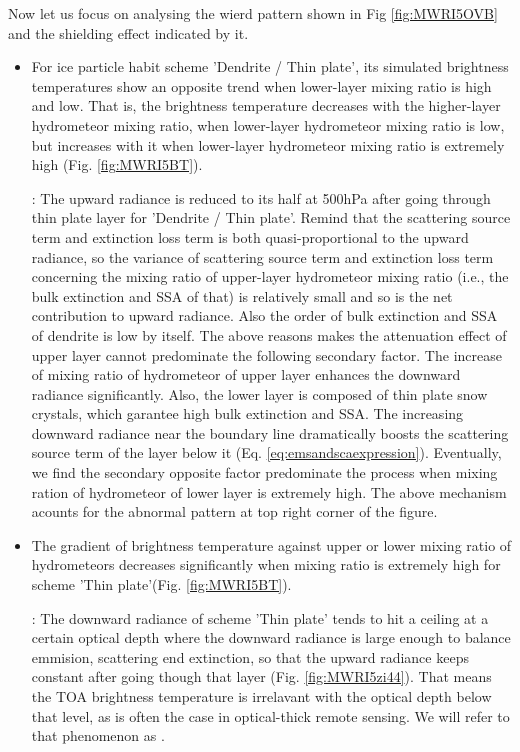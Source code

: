 Now let us focus on analysing the wierd pattern shown in Fig \ref{fig:MWRI5OVB} and the shielding effect indicated by it.
\begin{itemize}
    \item {}
    For ice particle habit scheme 'Dendrite / Thin plate', its simulated brightness temperatures show an opposite trend when 
lower-layer mixing ratio is high and low. That is, the brightness temperature decreases with the higher-layer hydrometeor mixing ratio,    
when lower-layer hydrometeor mixing ratio is low, but increases with it when lower-layer hydrometeor mixing ratio is extremely high
(Fig. \ref{fig:MWRI5BT}).

    :
    The upward radiance is reduced to its half at 500hPa after going through thin plate layer for 'Dendrite / Thin plate'. Remind that
the scattering source term and extinction loss term is both quasi-proportional to the upward radiance, so the variance of scattering source
term and extinction loss term concerning the mixing ratio of upper-layer hydrometeor mixing ratio (i.e., the bulk extinction and SSA of that)
is relatively small and so is the net contribution to upward radiance. Also the order of bulk extinction and SSA of dendrite is low by itself.
The above reasons makes the attenuation effect of upper layer cannot predominate the following secondary factor. 
    The increase of mixing ratio of hydrometeor of upper layer enhances the downward radiance significantly. Also, the lower layer is composed of
thin plate snow crystals, which garantee high bulk extinction and SSA. The increasing downward radiance near the boundary line dramatically boosts the
scattering source term of the layer below it (Eq. \ref{eq:emsandscaexpression}). Eventually, we find the secondary opposite factor predominate
the process when mixing ration of hydrometeor of lower layer is extremely high.   
    The above mechanism acounts for the abnormal pattern at top right corner of the figure.
    
    \item {}
    The gradient of brightness temperature against upper or lower mixing ratio of hydrometeors decreases significantly when mixing ratio is extremely high
for scheme 'Thin plate'(Fig. \ref{fig:MWRI5BT}). 

    :
    The downward radiance of scheme 'Thin plate' tends to hit a ceiling at a certain optical depth where the downward radiance is
large enough to balance emmision, scattering end extinction, so that the upward radiance keeps constant after going though that layer (Fig. \ref{fig:MWRI5zi44}).
That means the TOA brightness temperature is irrelavant with the optical depth below that level, as is often the case in optical-thick remote sensing.
We will refer to that phenomenon as .


\end{itemize}
